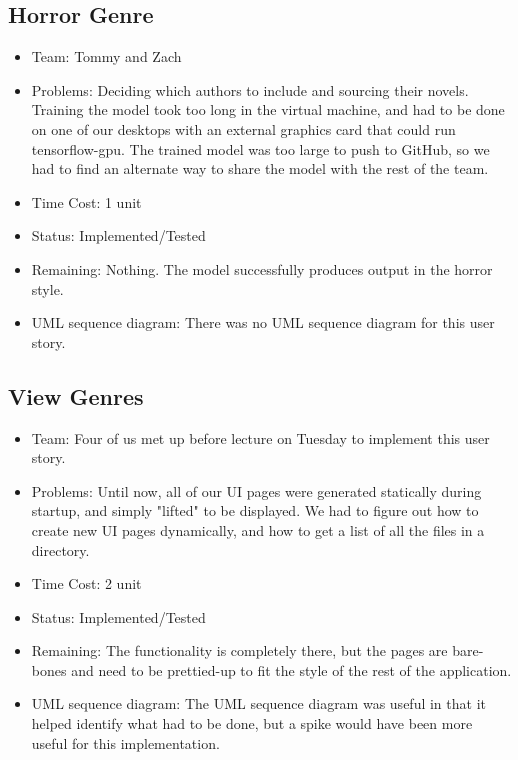 \documentclass[12pt]{article}
\begin{document}
\subsection{Horror Genre}
\begin{itemize}
\item Team: Tommy and Zach
\item Problems: Deciding which authors to include and sourcing their novels. Training the model took too long in the virtual machine, and had to be done on one of our desktops with an external graphics card that could run tensorflow-gpu. The trained model was too large to push to GitHub, so we had to find an alternate way to share the model with the rest of the team.
\item Time Cost: 1 unit 
\item Status: Implemented/Tested
\item Remaining: Nothing. The model successfully produces output in the horror style.
\item UML sequence diagram: There was no UML sequence diagram for this user story.
\end{itemize}

\subsection{View Genres}
\begin{itemize}
\item Team: Four of us met up before lecture on Tuesday to implement this user story.
\item Problems: Until now, all of our UI pages were generated statically during startup, and simply "lifted" to be displayed. We had to figure out how to create new UI pages dynamically, and how to get a list of all the files in a directory.
\item Time Cost: 2 unit 
\item Status: Implemented/Tested
\item Remaining: The functionality is completely there, but the pages are bare-bones and need to be prettied-up to fit the style of the rest of the application.
\item UML sequence diagram: The  UML sequence diagram was useful in that it helped identify what had to be done, but a spike would have been more useful for this implementation.
\end{itemize}
\end{document}
